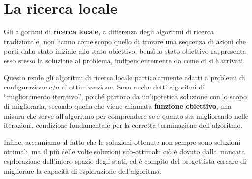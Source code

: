 \documentclass[a4paper, 11pt, oneside]{report}
\begin{document}
        \chapter{La ricerca locale}
        Gli algoritmi di \textbf{ricerca locale}, a differenza degli algoritmi di ricerca tradizionale, non hanno come scopo
        quello di trovare una sequenza di azioni che porti dallo stato iniziale allo stato obiettivo, bensì lo stato
        obiettivo rappresenta esso stesso la soluzione al problema, indipendentemente da come ci si è arrivati.
        \par \noindent Questo rende gli algoritmi di ricerca locale particolarmente adatti a problemi di configurazione
        e/o di ottimizzazione. Sono anche detti algoritmi di ``miglioramento iterativo'', poiché partono da un'ipotetica
        soluzione con lo scopo di migliorarla, secondo quella che viene chiamata \textbf{funzione obiettivo}, una misura
        che serve all'algoritmo per comprendere se e quanto sta migliorando nelle iterazioni, condizione fondamentale per
        la corretta terminazione dell'algoritmo.
        \par \noindent Infine, accenniamo al fatto che le soluzioni ottenute non sempre sono soluzioni ottimali, ma il
        più delle volte soluzioni sub-ottimali; ciò è dovuto dalla mancata esplorazione dell'intero spazio degli stati, ed è
        compito del progettista cercare di migliorare la capacità di esplorazione dell'algoritmo.
\end{document}
